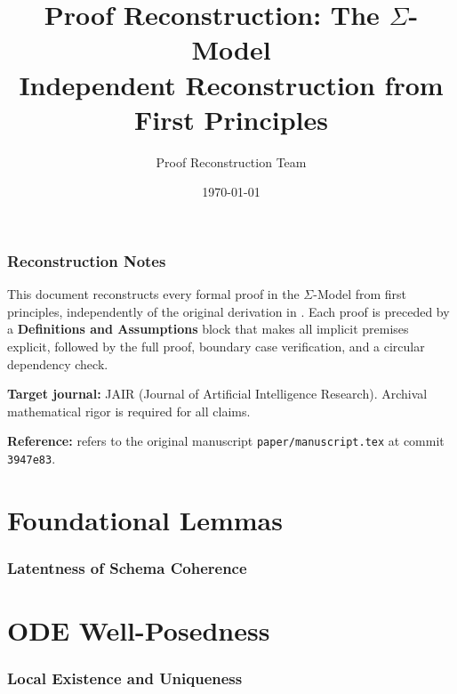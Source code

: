 \documentclass[11pt,a4paper]{article}
\title{\textbf{Proof Reconstruction: The $\Sigma$-Model}\\[6pt]
\large Independent Reconstruction from First Principles}
\author{Proof Reconstruction Team}
\date{\today}
\begin{document}
\maketitle

\tableofcontents

\section*{Reconstruction Notes}

This document reconstructs every formal proof in the $\Sigma$-Model from first
principles, independently of the original derivation in
\cite{basri2026sigma}. Each proof is preceded by a \textbf{Definitions
and Assumptions} block that makes all implicit premises explicit, followed
by the full proof, boundary case verification, and a circular dependency
check.

\vspace{3mm}
\noindent\textbf{Target journal:} JAIR (Journal of Artificial Intelligence Research).
Archival mathematical rigor is required for all claims.
\vspace{3mm}

\noindent\textbf{Reference:} \cite{basri2026sigma} refers to the original
manuscript \texttt{paper/manuscript.tex} at commit
\texttt{3947e83}.

\newpage

\part{Foundational Lemmas}

\section{Latentness of Schema Coherence}


\part{ODE Well-Posedness}

\section{Local Existence and Uniqueness}

\end{document}
